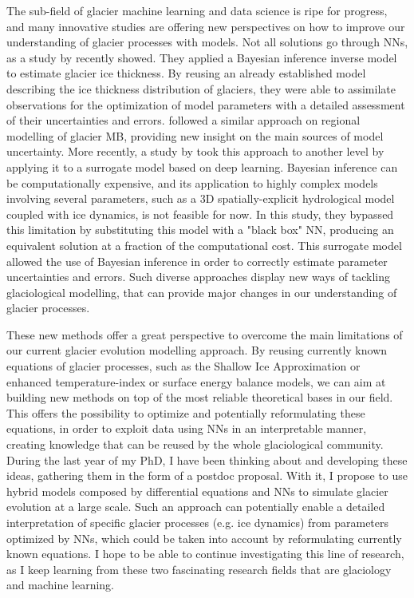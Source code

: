 The sub-field of glacier machine learning and data science is ripe for progress, and many innovative studies are offering new perspectives on how to improve our understanding of glacier processes with models. Not all solutions go through NNs, as a study by \citet{werder_bayesian_2019} recently showed. They applied a Bayesian inference inverse model to estimate glacier ice thickness. By reusing an already established model describing the ice thickness distribution of glaciers, they were able to assimilate observations for the optimization of model parameters with a detailed assessment of their uncertainties and errors. \citet{rounce_quantifying_2020} followed a similar approach on regional modelling of glacier MB, providing new insight on the main sources of model uncertainty. More recently, a study by \citet{brinkerhoff_constraining_2020} took this approach to another level by applying it to a surrogate model based on deep learning. Bayesian inference can be computationally expensive, and its application to highly complex models involving several parameters, such as a 3D spatially-explicit hydrological model coupled with ice dynamics, is not feasible for now. In this study, they bypassed this limitation by substituting this model with a "black box" NN, producing an equivalent solution at a fraction of the computational cost. This surrogate model allowed the use of Bayesian inference in order to correctly estimate parameter uncertainties and errors. Such diverse approaches display new ways of tackling glaciological modelling, that can provide major changes in our understanding of glacier processes. 

These new methods offer a great perspective to overcome the main limitations of our current glacier evolution modelling approach. By reusing currently known equations of glacier processes, such as the Shallow Ice Approximation \citep{hutter_theoretical_1983} or enhanced temperature-index or surface energy balance models, we can aim at building new methods on top of the most reliable theoretical bases in our field. This offers the possibility to optimize and potentially reformulating these equations, in order to exploit data using NNs in an interpretable manner, creating knowledge that can be reused by the whole glaciological community. During the last year of my PhD, I have been thinking about and developing these ideas, gathering them in the form of a postdoc proposal. With it, I propose to use hybrid models composed by differential equations and NNs to simulate glacier evolution at a large scale. Such an approach can potentially enable a detailed interpretation of specific glacier processes (e.g. ice dynamics) from parameters optimized by NNs, which could be taken into account by reformulating currently known equations. I hope to be able to continue investigating this line of research, as I keep learning from these two fascinating research fields that are glaciology and machine learning. 


